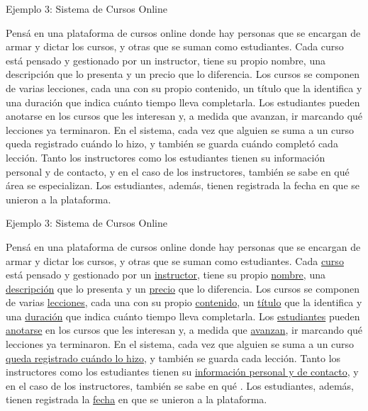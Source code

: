 \documentclass{beamer}
\begin{document}
\begin{frame}{Ejemplo 3: Sistema de Cursos Online}
    \begin{center}
        Pensá en una plataforma de cursos online donde hay personas que se encargan de armar y dictar los cursos, y otras que se suman como estudiantes. Cada curso está pensado y gestionado por un instructor, tiene su propio nombre, una descripción que lo presenta y un precio que lo diferencia. Los cursos se componen de varias lecciones, cada una con su propio contenido, un título que la identifica y una duración que indica cuánto tiempo lleva completarla. Los estudiantes pueden anotarse en los cursos que les interesan y, a medida que avanzan, ir marcando qué lecciones ya terminaron. En el sistema, cada vez que alguien se suma a un curso queda registrado cuándo lo hizo, y también se guarda cuándo completó cada lección. Tanto los instructores como los estudiantes tienen su información personal y de contacto, y en el caso de los instructores, también se sabe en qué área se especializan. Los estudiantes, además, tienen registrada la fecha en que se unieron a la plataforma.
        \small
    \end{center}
\end{frame}

\begin{frame}{Ejemplo 3: Sistema de Cursos Online}
    \begin{center}
        Pensá en una plataforma de cursos online donde hay personas que se encargan de armar y dictar los cursos, y otras que se suman como estudiantes. Cada \ul{curso} está pensado y gestionado por un \ul{instructor}, tiene su propio \ul{nombre}, una \ul{descripción} que lo presenta y un \ul{precio} que lo diferencia. Los cursos se componen de varias \ul{lecciones}, cada una con su propio \ul{contenido}, un \ul{título} que la identifica y una \ul{duración} que indica cuánto tiempo lleva completarla. Los \ul{estudiantes} pueden \ul{anotarse} en los cursos que les interesan y, a medida que \ul{avanzan}, ir marcando qué lecciones ya terminaron. En el sistema, cada vez que alguien se suma a un curso \ul{queda registrado cuándo lo hizo}, y también se guarda  cada lección. Tanto los instructores como los estudiantes tienen su \ul{información personal y de contacto}, y en el caso de los instructores, también se sabe en qué . Los estudiantes, además, tienen registrada la \ul{fecha} en que se unieron a la plataforma.
        \small
    \end{center}
\end{frame}
\end{document}
